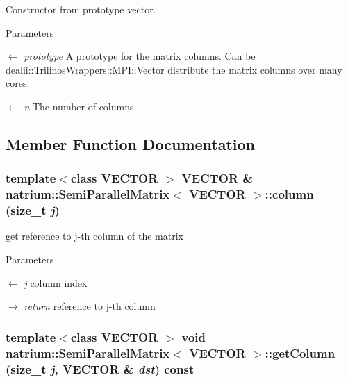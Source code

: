 Constructor from prototype vector. 
\begin{DoxyParams}{Parameters}
\item[\mbox{$\leftarrow$} {\em prototype}]A prototype for the matrix columns. Can be dealii::TrilinosWrappers::MPI::Vector distribute the matrix columns over many cores. \item[\mbox{$\leftarrow$} {\em n}]The number of columns \end{DoxyParams}


\subsection{Member Function Documentation}
\hypertarget{classnatrium_1_1SemiParallelMatrix_ae9deace949ec09098404defd48f78ccc}{
\subsubsection[{column}]{\setlength{\rightskip}{0pt plus 5cm}template$<$class VECTOR $>$ VECTOR \& {\bf natrium::SemiParallelMatrix}$<$ VECTOR $>$::column (size\_\-t {\em j})}}
\label{classnatrium_1_1SemiParallelMatrix_ae9deace949ec09098404defd48f78ccc}


get reference to j-\/th column of the matrix 
\begin{DoxyParams}{Parameters}
\item[\mbox{$\leftarrow$} {\em j}]column index \item[\mbox{$\rightarrow$} {\em return}]reference to j-\/th column \end{DoxyParams}
\hypertarget{classnatrium_1_1SemiParallelMatrix_a573e34e163358f87aee0f22742deda66}{
\subsubsection[{getColumn}]{\setlength{\rightskip}{0pt plus 5cm}template$<$class VECTOR $>$ void {\bf natrium::SemiParallelMatrix}$<$ VECTOR $>$::getColumn (size\_\-t {\em j}, \/  VECTOR \& {\em dst}) const}}
\label{classnatrium_1_1SemiParallelMatrix_a573e34e163358f87aee0f22742deda66}


